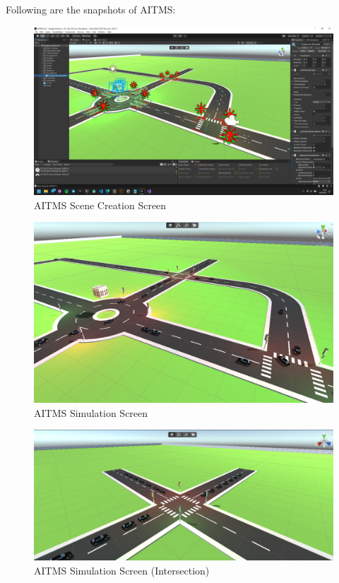 \documentclass[openany,12pt]{report}
\begin{document}
		
		
		\hspace*{0.5in}Following are the snapshots of AITMS:
		
		\begin{figure}[H]
			\centering
			\includegraphics[width=6in]{./Diagrams/PNG/scene}
			\caption{AITMS Scene Creation Screen}
		\end{figure}
		
		\begin{figure}[H]
			\centering
			\includegraphics[width=6in]{./Diagrams/PNG/cross}
			\caption{AITMS Simulation Screen}
		\end{figure}
		
		\begin{figure}[H]
			\centering
			\includegraphics[width=6in]{./Diagrams/PNG/licescene2}
			\caption{AITMS Simulation Screen (Intersection)}
		\end{figure}
		
\end{document}
